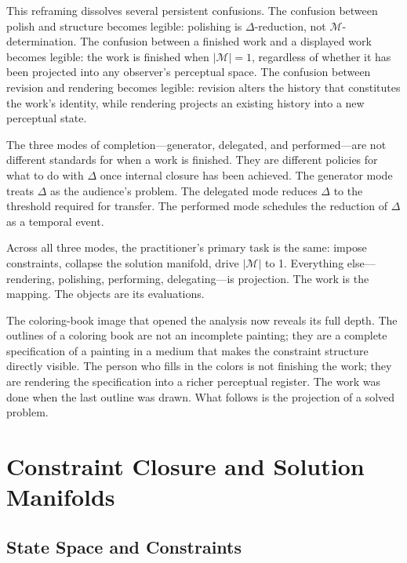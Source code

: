 \documentclass[12pt, twoside]{article}
\theoremstyle{plain}
\theoremstyle{definition}
\theoremstyle{remark}
\begin{document}
This reframing dissolves several persistent confusions. The confusion between polish and structure becomes legible: polishing is $\Delta$-reduction, not $\mathcal{M}$-determination. The confusion between a finished work and a displayed work becomes legible: the work is finished when $|\mathcal{M}| = 1$, regardless of whether it has been projected into any observer's perceptual space. The confusion between revision and rendering becomes legible: revision alters the history that constitutes the work's identity, while rendering projects an existing history into a new perceptual state.

The three modes of completion---generator, delegated, and performed---are not different standards for when a work is finished. They are different policies for what to do with $\Delta$ once internal closure has been achieved. The generator mode treats $\Delta$ as the audience's problem. The delegated mode reduces $\Delta$ to the threshold required for transfer. The performed mode schedules the reduction of $\Delta$ as a temporal event.

Across all three modes, the practitioner's primary task is the same: impose constraints, collapse the solution manifold, drive $|\mathcal{M}|$ to 1. Everything else---rendering, polishing, performing, delegating---is projection. The work is the mapping. The objects are its evaluations.

The coloring-book image that opened the analysis now reveals its full depth. The outlines of a coloring book are not an incomplete painting; they are a complete specification of a painting in a medium that makes the constraint structure directly visible. The person who fills in the colors is not finishing the work; they are rendering the specification into a richer perceptual register. The work was done when the last outline was drawn. What follows is the projection of a solved problem.

\appendix
\renewcommand{\thesection}{\Alph{section}}

\section{Constraint Closure and Solution Manifolds}
\label{app:closure}

\subsection{State Space and Constraints}
\end{document}
